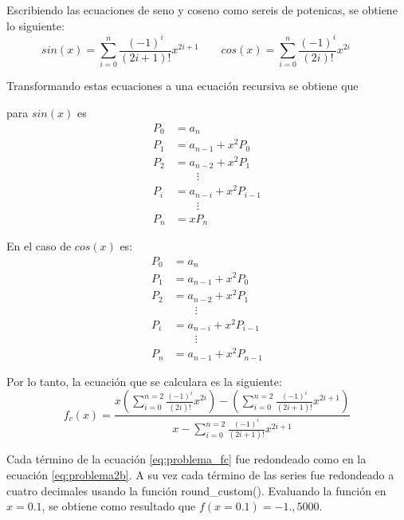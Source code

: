 Escribiendo las ecuaciones de seno y coseno como sereis de potenicas, se obtiene lo siguiente:
\begin{equation*}
    sin(x) = \sum_{i=0}^n \frac{(-1)^i}{(2i+1)!} x^{2i+1} \qquad
    cos(x) = \sum_{i=0}^n \frac{(-1)^i}{(2i)!} x^{2i} \qquad
\end{equation*}

Transformando estas ecuaciones a una ecuación recursiva se obtiene que

\begin{minipage}{0.45\linewidth}
    para $sin(x)$ es
    \begin{align*}
        P_0 & = a_n                  \\
        P_1 & = a_{n-1} + x^2P_0     \\
        P_2 & = a_{n-2} + x^2P_1     \\
            & \qquad\vdots           \\
        P_i & = a_{n-i} + x^2P_{i-1} \\
            & \qquad\vdots           \\
        P_n & = xP_n
    \end{align*}
\end{minipage}
\begin{minipage}{0.45\linewidth}
    En el caso de $cos(x)$ es:
    \begin{align*}
        P_0 & = a_n                  \\
        P_1 & = a_{n-1} + x^2P_0     \\
        P_2 & = a_{n-2} + x^2P_1     \\
            & \qquad\vdots           \\
        P_i & = a_{n-i} + x^2P_{i-1} \\
            & \qquad\vdots           \\
        P_n & = a_{n-1}+x^2P_{n-1}
    \end{align*}
\end{minipage}

Por lo tanto, la ecuación que se calculara es la siguiente:
\begin{equation}
    f_c(x) = \frac{x\left(\sum\limits_{i=0}^{n=2} \frac{(-1)^i}{(2i)!} x^{2i}\right)- \left(\sum\limits_{i=0}^{n=2} \frac{(-1)^i}{(2i+1)!}x^{2i+1}\right) }{x-\sum\limits_{i=0}^{n=2} \frac{(-1)^i}{(2i+1)!} x^{2i+1}}
    \label{eq:problema_fc}
\end{equation}

Cada término de la ecuación \ref{eq:problema_fc} fue redondeado como en la ecuación \ref{eq:problema2b}. A su vez cada término de las series fue redondeado a cuatro decimales usando la función \textcolor{citecolor}{round\_custom()}.
Evaluando la función en $x=0.1$, se obtiene como resultado que $f(x=0.1)=-1.,5000$.